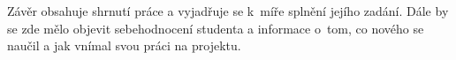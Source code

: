 \documentclass[11pt,a4paper,twoside,openright]{report}
\let\openright=\cleardoublepage
\begin{document}
	
	Závěr obsahuje shrnutí práce a vyjadřuje se k~míře splnění jejího zadání. Dále by se zde mělo objevit sebehodnocení studenta a informace o~tom, co nového se naučil a jak vnímal svou práci na projektu.
	
	
	\nocite{dokumentace}
	\nocite{medium}
	\nocite{citace}
	\nocite{Historie_pi}
	\nocite{wiki:pi}
	\nocite{zvyrazneni_kodu}
	\printbibliography[title={Seznam použité literatury},heading={bibintoc}]
	
	\openright
	\listoffigures
	
	\clearpage
	\listoftables
	
	
	
\end{document}
